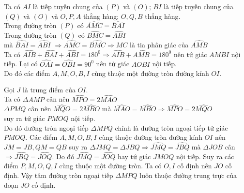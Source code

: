 \begin{ex}
{\begin{center}
	\end{center}
\begin{listEX}
	\item Ta có $AI$ là tiếp tuyến chung của $(P)$ và $(O)$; $BI$ là tiếp tuyến chung của $(Q)$ và $(O)$ và $O, P, A$ thẳng hàng; $O, Q, B$ thẳng hàng.\\
	Trong đường tròn $(P)$ có $\widehat{AMC} = \widehat{BAI}$\\
	Trong đường tròn $(Q)$ có $\widehat{BMC} = \widehat{ABI}$\\
	mà $\widehat{BAI} = \widehat{ABI}$ $\Rightarrow \widehat{AMC} = \widehat{BMC} \Rightarrow MC$ là tia phân giác của $\widehat{AMB}$\\
	Ta có $\widehat{AIB} + \widehat{BAI} + \widehat{ABI} = 180^0 \Rightarrow \widehat{AIB} + \widehat{AMB} = 180^0$ nên tứ giác $AMBI$ nội tiếp. Lại có $\widehat{OAI} = \widehat{OBI} = 90^0$ nên tứ giác $AOBI$ nội tiếp.\\
	Do đó các điểm $A, M, O, B, I$ cùng thuộc một đường tròn đường kính $OI$.   
	\item Gọi $J$ là trung điểm của $OI$.\\
	Ta có $\Delta AMP$ cân nên $\widehat{MPO} = 2 \widehat{MAO}$\\
	$\Delta PMQ$ cân nên  $\widehat{MQO} = 2 \widehat{MBO}$ mà  $\widehat{MAO} = \widehat{MBO} \Rightarrow \widehat{MPO} = 2 \widehat{MQO}$ \\
	suy ra tứ giác $PMOQ$ nội tiếp.\\
	Do đó đường tròn ngoại tiếp $\Delta MPQ$ chính là đường tròn ngoại tiếp tứ giác $PMOQ$. Các điểm $A, M, O, B, I$ cùng thuộc đường tròn đường kính $OI$ nên $JM = JB, QM = QB$ suy ra $\Delta JMQ = \Delta JBQ \Rightarrow \widehat{JMQ} = \widehat{JBQ}$ mà $\Delta JOB$ cân $\Rightarrow \widehat{JBQ} = \widehat{JOQ}$. Do đó $\widehat{JMQ} = \widehat{JOQ}$ hay tứ giác $JMOQ$ nội tiếp. Suy ra các điểm $P, M, O, Q, I$ cùng thuộc một đường tròn. Ta có $O, I$ cố định nên $JO$ cố định. Vậy tâm đường tròn ngoại tiếp $\Delta MPQ$ luôn thuộc đường trung trực của đoạn $JO$ cố định.
\end{listEX}		
	}
\end{ex}
